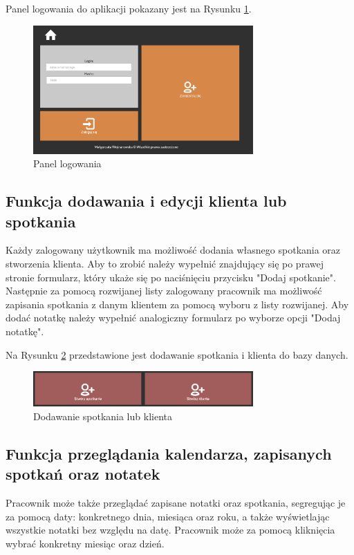 \documentclass[eng,printmode,openany,oneside]{mgr}
\begin{document}
Panel logowania do aplikacji pokazany jest na Rysunku \ref{fig:5}.

\begin{figure}[H]
	\centering
	\includegraphics[width=0.75\textwidth]{logowanie}
	\caption{Panel logowania}
	\label{fig:5}
\end{figure}


	
	\subsection*{Funkcja dodawania i edycji klienta lub spotkania}
	Każdy zalogowany użytkownik ma możliwość dodania własnego spotkania oraz stworzenia klienta. Aby to zrobić należy wypełnić znajdujący się po prawej stronie formularz, który ukaże się po naciśnięciu przycisku "Dodaj spotkanie". Następnie za pomocą rozwijanej listy zalogowany pracownik ma możliwość zapisania spotkania z danym klientem za pomocą wyboru z listy rozwijanej. Aby dodać notatkę należy wypełnić analogiczny formularz po wyborze opcji "Dodaj notatkę". 

Na Rysunku \ref{fig:6} przedstawione jest dodawanie spotkania i klienta do bazy danych.

\begin{figure}[H]
	\centering
	\includegraphics[width=0.75\textwidth]{dodaj_spotkanie_klient}
	\caption{Dodawanie spotkania lub klienta}
	\label{fig:6}
\end{figure}

	
	\subsection*{Funkcja przeglądania kalendarza, zapisanych spotkań oraz notatek}
	Pracownik może także przeglądać zapisane notatki oraz spotkania, segregując je za pomocą daty: konkretnego dnia, miesiąca oraz roku, a także wyświetlając wszystkie notatki bez względu na datę. Pracownik może za pomocą kliknięcia wybrać konkretny miesiąc oraz dzień. 
\end{document}
